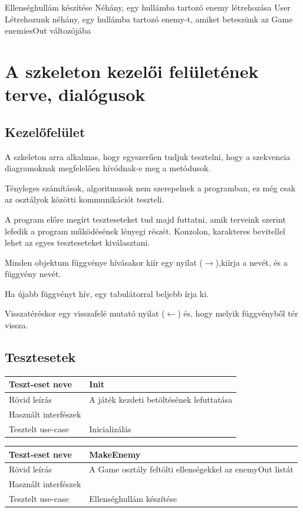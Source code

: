 \usecase
{Ellenséghullám készítése}
{Néhány, egy hullámba tartozó enemy létrehozása}
{User}
{Létrehozunk néhány, egy hullámba tartozó enemy-t, amiket beteszünk az Game enemiesOut változójába}


\section{A szkeleton kezelői felületének terve, dialógusok}
\subsection{Kezelőfelület}
A szkeleton arra alkalmas, hogy egyszerűen tudjuk tesztelni, hogy a szekvencia diagramoknak megfelelően hívódnak-e meg a metódusok.

Tényleges számítások, algoritmusok nem szerepelnek a programban, ez még csak az osztályok közötti kommunikációt teszteli.

A program előre megírt teszteseteket tud majd futtatni, amik terveink szerint lefedik a program működésének lényegi részét.
Konzolon, karakteres bevitellel lehet az egyes teszteseteket kiválasztani. 

Minden objektum függvénye hívásakor kiír egy nyilat ($\rightarrow$),kiírja a nevét, és a függvény nevét.

Ha újabb függvényt hív, egy tabulátorral beljebb írja ki.

Visszatéréskor egy visszafelé mutató nyilat ($\leftarrow$) és, hogy melyik függvényből tér vissza.

\subsection{Tesztesetek}
%
%
\newcommand{\usecaseteszteset}[4]
{
	\begin{longtable}{| l | p{10cm} |}
	\hline
	\textbf{Teszt-eset neve}   & {\textbf{#1}} \tabularnewline
	\hline\hline
	Rövid leírás    & {#2} \tabularnewline
	\hline
	Használt interfészek    & {#3} \tabularnewline
	\hline
	Tesztelt use-case	& {#4} \tabularnewline
	\hline
	\end{longtable}
}


\usecaseteszteset
{Init}
{A játék kezdeti betöltésének lefuttatása}
{}
{Inicializálás}
 
\usecaseteszteset
{MakeEnemy}
{A Game osztály feltölti ellenségekkel az enemyOut listát}
{}
{Ellenséghullám készítése}

